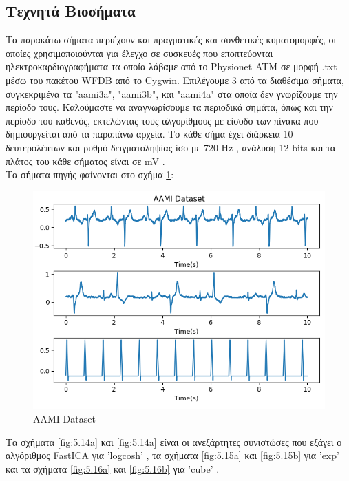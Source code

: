 \subsection{Τεχνητά Βιοσήματα}
\justifying
Τα παρακάτω σήματα περιέχουν και πραγματικές και συνθετικές κυματομορφές, οι οποίες χρησιμοποιούνται για έλεγχο σε συσκευές που εποπτεύονται ηλεκτροκαρδιογραφήματα τα οποία λάβαμε από το \en Physionet ATM \gr \cite{signals:18} σε μορφή \en .txt \gr μέσω του πακέτου \en WFDB \gr \cite{db:19} από το \en Cygwin. \gr Επιλέγουμε 3 από τα διαθέσιμα σήματα, συγκεκριμένα τα \en "aami3a", "aami3b", \gr και \en "aami4a" \gr στα οποία δεν γνωρίζουμε την περίοδο τους. Καλούμαστε να αναγνωρίσουμε τα περιοδικά σημάτα, όπως και την περίοδο του καθενός, εκτελώντας τους αλγορίθμους με είσοδο των πίνακα που δημιουργείται από τα παραπάνω αρχεία. Το κάθε σήμα έχει διάρκεια 10 δευτερολέπτων και ρυθμό δειγματοληψίας ίσο με 720 \en Hz \gr, ανάλυση 12 \en bits \gr και τα πλάτος του κάθε σήματος είναι σε \en mV \gr. 
\\ [0.5 \baselineskip]
Τα σήματα πηγής φαίνονται στο σχήμα \ref{fig:5.13}:
\begin{figure}[H]
    \centering
    \includegraphics[width=\textwidth]{biosignals/aami_source.png}
    \caption{\en AAMI Dataset} \gr
    \label{fig:5.13}
\end{figure}
\noindent Τα σχήματα \en \ref{fig:5.14a} \gr και \en \ref{fig:5.14a} \gr είναι οι ανεξάρτητες συνιστώσες που εξάγει ο αλγόριθμος \en FastICA \gr για \en 'logcosh' \gr, τα σχήματα \en \ref{fig:5.15a} \gr   και \en \ref{fig:5.15b} \gr  για \en 'exp' \gr και τα σχήματα \en \ref{fig:5.16a} \gr και \en \ref{fig:5.16b} \gr για \en 'cube' \gr.
